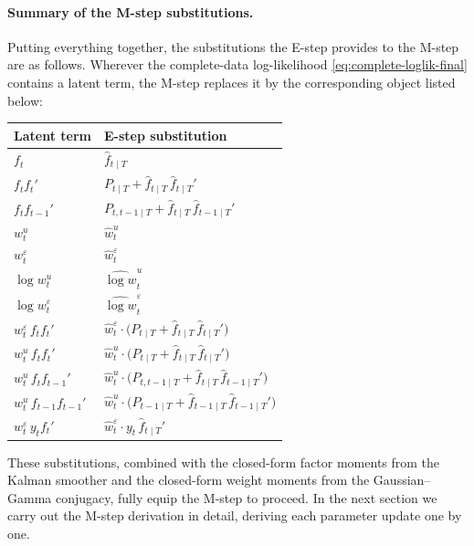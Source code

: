 \documentclass[11pt, a4paper, oneside]{article}
\begin{document}
\newpage

\paragraph{Summary of the M-step substitutions.}
Putting everything together, the substitutions the E-step provides to
the M-step are as follows. Wherever the complete-data log-likelihood
\eqref{eq:complete-loglik-final} contains a latent term, the M-step
replaces it by the corresponding object listed below:
\begin{center}
\small
\renewcommand{\arraystretch}{1.4}
\begin{tabular}{@{}p{4.8cm} p{8cm}@{}}
\toprule
\textbf{Latent term} & \textbf{E-step substitution} \\
\midrule
$f_t$ & $\hat{f}_{t \mid T}$ \\
$f_t f_t'$ & $P_{t \mid T} + \hat{f}_{t \mid T}\,\hat{f}_{t \mid T}'$ \\
$f_t f_{t-1}'$ & $P_{t, t-1 \mid T} + \hat{f}_{t \mid T}\,\hat{f}_{t-1 \mid T}'$ \\
$w^u_t$ & $\hat{w}^u_t$ \\
$w^\varepsilon_t$ & $\hat{w}^\varepsilon_t$ \\
$\log w^u_t$ & $\widehat{\log w}^u_t$ \\
$\log w^\varepsilon_t$ & $\widehat{\log w}^\varepsilon_t$ \\
$w^\varepsilon_t\, f_t f_t'$ & $\hat{w}^\varepsilon_t \cdot \big(P_{t \mid T} + \hat{f}_{t \mid T}\,\hat{f}_{t \mid T}'\big)$ \\
$w^u_t\, f_t f_t'$ & $\hat{w}^u_t \cdot \big(P_{t \mid T} + \hat{f}_{t \mid T}\,\hat{f}_{t \mid T}'\big)$ \\
$w^u_t\, f_t f_{t-1}'$ & $\hat{w}^u_t \cdot \big(P_{t, t-1 \mid T} + \hat{f}_{t \mid T}\,\hat{f}_{t-1 \mid T}'\big)$ \\
$w^u_t\, f_{t-1} f_{t-1}'$ & $\hat{w}^u_t \cdot \big(P_{t-1 \mid T} + \hat{f}_{t-1 \mid T}\,\hat{f}_{t-1 \mid T}'\big)$ \\
$w^\varepsilon_t\, y_t f_t'$ & $\hat{w}^\varepsilon_t \cdot y_t\, \hat{f}_{t \mid T}'$ \\
\bottomrule
\end{tabular}
\end{center}

These substitutions, combined with the closed-form factor moments from
the Kalman smoother and the closed-form weight moments from the
Gaussian–Gamma conjugacy, fully equip the M-step to proceed. In the
next section we carry out the M-step derivation in detail, deriving
each parameter update one by one.
\end{document}
